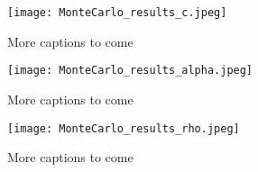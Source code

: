 \documentclass[12pt]{article}
\theoremstyle{definition}
\begin{document}
\begin{figure}[t!]
  \texttt{[image: MonteCarlo\_results\_c.jpeg]}
  \caption{More captions to come}
  \label{fig:MonteCarlo_results_c}
\end{figure}


\begin{figure}[t!]
  \texttt{[image: MonteCarlo\_results\_alpha.jpeg]}
  \caption{More captions to come}
  \label{fig:MonteCarlo_results_alpha}
\end{figure}


\begin{figure}[t!]
  \texttt{[image: MonteCarlo\_results\_rho.jpeg]}
  \caption{More captions to come}
  \label{fig:MonteCarlo_results_rho}
\end{figure}
\end{document}
